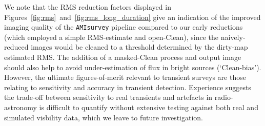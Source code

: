 \documentclass[5p,authoryear]{elsarticle}
\begin{document}
We note that the RMS reduction factors displayed in Figures~\ref{fig:rms}~and~\ref{fig:rms_long_duration} give an indication of the improved imaging quality of the \texttt{AMIsurvey} pipeline compared to our early reductions (which employed a simple RMS-estimate and open-Clean), since the naively-reduced images would be cleaned to a threshold determined by the dirty-map estimated RMS. 
The addition of a masked-Clean process and output image should also help to avoid under-estimation of flux in bright sources (`Clean-bias').
However, the ultimate figures-of-merit relevant to transient surveys are those relating to sensitivity and accuracy in transient detection. 
Experience suggests the trade-off between sensitivity to real transients and artefacts in radio-astronomy is difficult to quantify without extensive testing against both real and simulated visbility data, which we leave to future investigation.
\end{document}
